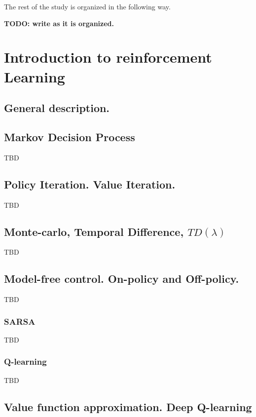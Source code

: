 \documentclass{article}
\begin{document}
The rest of the study is organized in the following way. 

{\bf TODO: write as it is organized.}


\section{Introduction to reinforcement Learning}

\subsection{General description. }

\subsection{Markov Decision Process}

TBD

\subsection{Policy Iteration. Value Iteration.}

TBD

\subsection{Monte-carlo, Temporal Difference, $TD(\lambda)$}

TBD

\subsection{Model-free control. On-policy and Off-policy.}

TBD

\subsubsection{SARSA}

TBD

\subsubsection{Q-learning}

TBD

\subsection{Value function approximation. Deep Q-learning}
\end{document}
